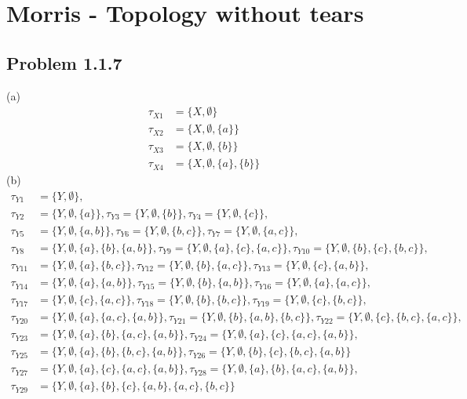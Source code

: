 \documentclass[../main.tex]{subfiles}
\begin{document}
\section{{\sc Morris} - Topology without tears}
\subsection{Problem 1.1.7}
(a) 
\begin{align}
\tau_{X1}&=\{X,\emptyset\}\\
\tau_{X2}&=\{X,\emptyset,\{a\}\}\\
\tau_{X3}&=\{X,\emptyset,\{b\}\}\\
\tau_{X4}&=\{X,\emptyset,\{a\},\{b\}\}
\end{align}
(b) 
\begin{align}
\tau_{Y1}&=\{Y,\emptyset\},\\
%
\tau_{Y2}&=\{Y,\emptyset,\{a\}\},\tau_{Y3}=\{Y,\emptyset,\{b\}\},\tau_{Y4}=\{Y,\emptyset,\{c\}\},\\
%
\tau_{Y5}&=\{Y,\emptyset,\{a,b\}\},\tau_{Y6}=\{Y,\emptyset,\{b,c\}\},\tau_{Y7}=\{Y,\emptyset,\{a,c\}\},\\
%
\tau_{Y8}&=\{Y,\emptyset,\{a\},\{b\},\{a,b\}\},
\tau_{Y9}=\{Y,\emptyset,\{a\},\{c\},\{a,c\}\},
\tau_{Y10}=\{Y,\emptyset,\{b\},\{c\},\{b,c\}\},\\
%
\tau_{Y11}&=\{Y,\emptyset,\{a\},\{b,c\}\},
\tau_{Y12}=\{Y,\emptyset,\{b\},\{a,c\}\},
\tau_{Y13}=\{Y,\emptyset,\{c\},\{a,b\}\},\\
%
\tau_{Y14}&=\{Y,\emptyset,\{a\},\{a,b\}\},
\tau_{Y15}=\{Y,\emptyset,\{b\},\{a,b\}\},
\tau_{Y16}=\{Y,\emptyset,\{a\},\{a,c\}\},\\
%
\tau_{Y17}&=\{Y,\emptyset,\{c\},\{a,c\}\},
\tau_{Y18}=\{Y,\emptyset,\{b\},\{b,c\}\},
\tau_{Y19}=\{Y,\emptyset,\{c\},\{b,c\}\},\\
%
\tau_{Y20}&=\{Y,\emptyset,\{a\},\{a,c\},\{a,b\}\},
\tau_{Y21}=\{Y,\emptyset,\{b\},\{a,b\},\{b,c\}\},
\tau_{Y22}=\{Y,\emptyset,\{c\},\{b,c\},\{a,c\}\},\\
%
\tau_{Y23}&=\{Y,\emptyset,\{a\},\{b\},\{a,c\},\{a,b\}\},
\tau_{Y24}=\{Y,\emptyset,\{a\},\{c\},\{a,c\},\{a,b\}\},\\
%
\tau_{Y25}&=\{Y,\emptyset,\{a\},\{b\},\{b,c\},\{a,b\}\},
\tau_{Y26}=\{Y,\emptyset,\{b\},\{c\},\{b,c\},\{a,b\}\}\\
%
\tau_{Y27}&=\{Y,\emptyset,\{a\},\{c\},\{a,c\},\{a,b\}\},
\tau_{Y28}=\{Y,\emptyset,\{a\},\{b\},\{a,c\},\{a,b\}\},\\
%
\tau_{Y29}&=\{Y,\emptyset,\{a\},\{b\},\{c\},\{a,b\},\{a,c\},\{b,c\}\}
\end{align}
\end{document}

